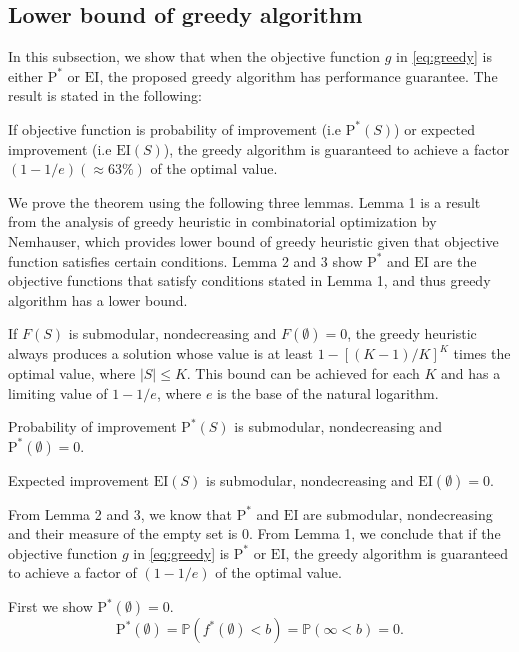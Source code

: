 \documentclass[opre,nonblindrev]{informs3} %
\newcommand{\EI}{\mathrm{EI}}
\newcommand{\PI}{\text{P}^*}
\begin{document}
\subsection{Lower bound of greedy algorithm}
In this subsection, we show that when the objective function $g$ in \eqref{eq:greedy} is either $\PI$ or $\EI$, the proposed greedy algorithm has performance guarantee. The result is stated in the following:
\begin{theorem} 
If objective function is probability of improvement (i.e $\PI(S)$) or expected improvement (i.e $\EI(S)$), the greedy algorithm is guaranteed to achieve a factor $(1-1/e) (\approx 63\%)$ of the optimal value.
\end{theorem}
We prove the theorem using the following three lemmas. Lemma 1 is a result from the analysis of greedy heuristic in combinatorial optimization by Nemhauser, which provides lower bound of greedy heuristic given that objective function satisfies certain conditions. Lemma 2 and 3 show $\PI$ and $\EI$ are the objective functions that satisfy conditions stated in Lemma 1, and thus greedy algorithm has a lower bound.
\begin{lemma} \cite{Company1978}
If $F(S)$ is submodular, nondecreasing and $F(\emptyset)=0$, the greedy heuristic always produces a solution whose value is at least $1-[(K-1)/K]^K$ times the optimal value, where $|S| \leq K$. This bound can be achieved for each $K$ and has a limiting value of $1-1/e$, where $e$ is the base of the natural logarithm.
\end{lemma}

\begin{lemma} 
  Probability of improvement $\PI(S)$ is submodular, nondecreasing and $\PI(\emptyset)=0$.
\end{lemma}
\begin{lemma}
  Expected improvement $\EI(S)$ is submodular, nondecreasing and $\EI(\emptyset)=0$.
\end{lemma}

From Lemma 2 and 3, we know that $\PI$ and $\EI$ are submodular, nondecreasing and their measure of the empty set is 0. From Lemma 1, we conclude that if the objective function $g$ in \eqref{eq:greedy} is $\PI$ or $\EI$, the greedy algorithm is guaranteed to achieve a factor of $(1-1/e)$ of the optimal value. \Halmos
\endproof

First we show $\PI(\emptyset) = 0$.
\begin{equation*}
  \PI(\emptyset) = \mathbb{P}(f^*(\emptyset)<b) = \mathbb{P}(\infty<b)=0.
\end{equation*}
\end{document}
